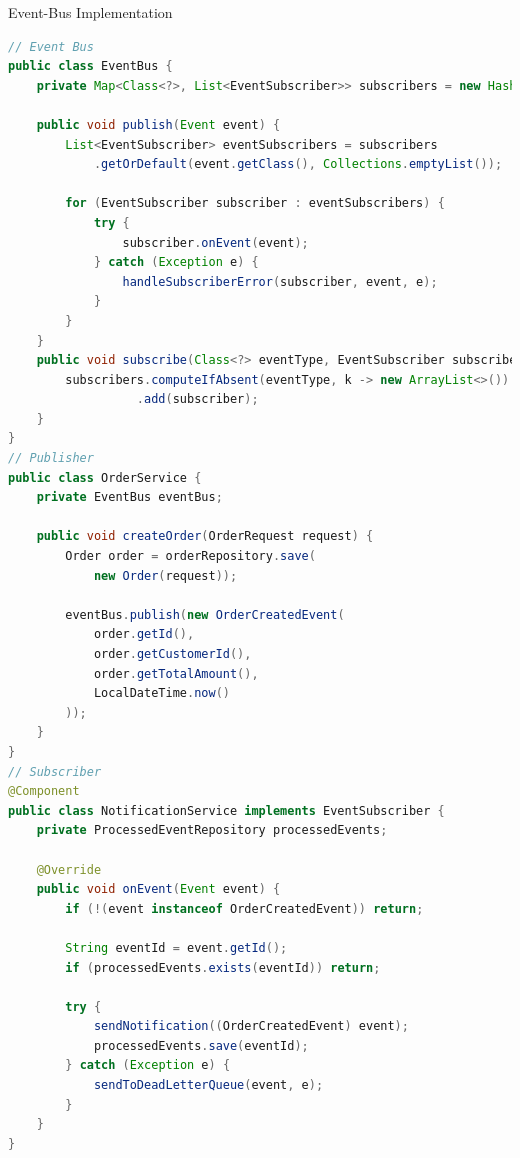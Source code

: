 \begin{example2}{Event-Bus Implementation}
\begin{lstlisting}[language=Java, style=basesmol]
// Event Bus
public class EventBus {
    private Map<Class<?>, List<EventSubscriber>> subscribers = new HashMap<>();
    
    public void publish(Event event) {
        List<EventSubscriber> eventSubscribers = subscribers
            .getOrDefault(event.getClass(), Collections.emptyList());
            
        for (EventSubscriber subscriber : eventSubscribers) {
            try {
                subscriber.onEvent(event);
            } catch (Exception e) {
                handleSubscriberError(subscriber, event, e);
            }
        }
    }
    public void subscribe(Class<?> eventType, EventSubscriber subscriber) {
        subscribers.computeIfAbsent(eventType, k -> new ArrayList<>())
                  .add(subscriber);
    }
}
// Publisher
public class OrderService {
    private EventBus eventBus;
    
    public void createOrder(OrderRequest request) {
        Order order = orderRepository.save(
            new Order(request));
            
        eventBus.publish(new OrderCreatedEvent(
            order.getId(),
            order.getCustomerId(),
            order.getTotalAmount(),
            LocalDateTime.now()
        ));
    }
}
// Subscriber
@Component
public class NotificationService implements EventSubscriber {
    private ProcessedEventRepository processedEvents;
    
    @Override
    public void onEvent(Event event) {
        if (!(event instanceof OrderCreatedEvent)) return;
        
        String eventId = event.getId();
        if (processedEvents.exists(eventId)) return;
        
        try {
            sendNotification((OrderCreatedEvent) event);
            processedEvents.save(eventId);
        } catch (Exception e) {
            sendToDeadLetterQueue(event, e);
        }
    }
}
\end{lstlisting}
\end{example2}



